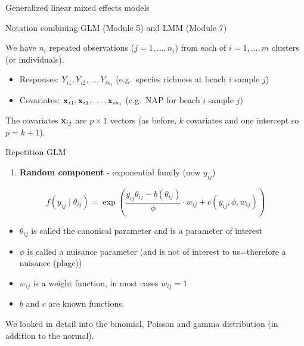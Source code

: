 \documentclass[
  ignorenonframetext,
]{beamer}
\providecommand{\tightlist}{%
  \setlength{\itemsep}{0pt}\setlength{\parskip}{0pt}}
\begin{document}
\begin{frame}{Generalized linear mixed effects models}
\protect{}\label{generalized-linear-mixed-effects-models}
\begin{block}{Notation}
\protect{}\label{notation}
combining GLM (Module 5) and LMM (Module 7)

We have \(n_i\) repeated observations (\(j=1,\ldots, n_i\)) from each of
\(i=1,\ldots,m\) clusters (or individuals).

\begin{itemize}
\tightlist
\item
  Responses: \(Y_{i1},Y_{i2},\ldots, Y_{in_i}\) (e.g.~species richness
  at beach \(i\) sample \(j\))
\item
  Covariates: \({\bf x}_{i1},{\bf x}_{i1}, \ldots, {\bf x}_{in_i}\)
  (e.g.~NAP for beach \(i\) sample \(j\))
\end{itemize}

The covariates \({\bf x}_{ij}\) are \(p\times 1\) vectors (as before,
\(k\) covariates and one intercept so \(p=k+1\)).
\end{block}
\end{frame}

\begin{frame}
\begin{block}{Repetition GLM}
\protect{}\label{repetition-glm}
\begin{enumerate}
\tightlist
\item
  \textbf{Random component} - exponential family (now \(y_{ij}\))
\end{enumerate}

\[ f(y_{ij}\mid \theta_{ij})=\exp \left( \frac{y_{ij} \theta_{ij}-b(\theta_{ij})}{\phi}\cdot w_{ij} + c(y_{ij}, \phi, w_{ij}) \right) \]

\begin{itemize}
\item
  \(\theta_{ij}\) is called the canonical parameter and is a parameter
  of interest
\item
  \(\phi\) is called a nuisance parameter (and is not of interest to
  us=therefore a nuisance (plage))
\item
  \(w_{ij}\) is a weight function, in most cases \(w_{ij}=1\)
\item
  \(b\) and \(c\) are known functions.
\end{itemize}

We looked in detail into the binomial, Poisson and gamma distribution
(in addition to the normal).
\end{block}
\end{frame}
\end{document}
